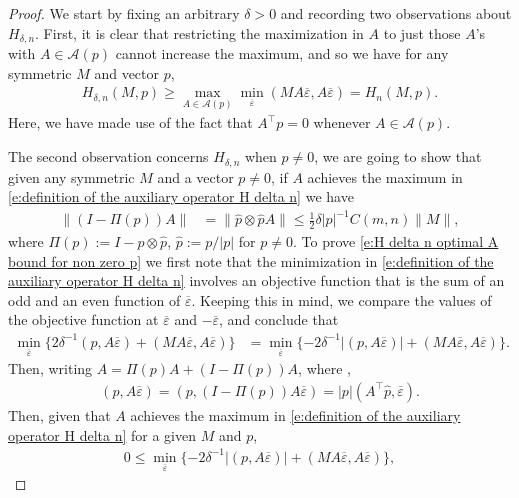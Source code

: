 \documentclass[reqno]{amsart}
\numberwithin{equation}{section}
\begin{document}
\begin{proof} We start by fixing an arbitrary $\delta>0$ and recording two observations about $H_{\delta,n}$. First, it is clear that restricting the maximization in $A$ to just those $A$'s with $A\in \mathcal{A}(p)$ cannot increase the maximum, and so we have for any symmetric $M$ and vector $p$,
\begin{align}\label{e:H delta n basic lower pointwise bound}
  H_{\delta,n}(M,p) \geq \max_{A\in\mathcal{A}(p)}\min_{\overline\varepsilon}(MA\overline\varepsilon,A\overline\varepsilon) = H_n(M,p).    
\end{align}
Here, we have made use of the fact that $A^\top p = 0$ whenever $A \in \mathcal{A}(p)$. 

The second observation concerns $H_{\delta,n}$ when $p\neq 0$, we are going to show that given any symmetric $M$ and a vector $p\neq 0$, if $A$ achieves the maximum in \eqref{e:definition of the auxiliary operator H delta n} we have 
\begin{align}\label{e:H delta n optimal A bound for non zero p}
  \|(I-\Pi(p))A\| & = 
\|\hat p \otimes \hat p A\| \leq \tfrac{1}{2}\delta |p|^{-1} C(m,n)\|M\|,  
\end{align}
where $\Pi(p) := I-\hat p\otimes \hat p$, $\hat p := p/|p|$ for $p\neq 0$. To prove \eqref{e:H delta n optimal A bound for non zero p} we first note that the minimization in \eqref{e:definition of the auxiliary operator H delta n} involves an objective function that is the sum of an odd and an even function of $\overline \varepsilon$. Keeping this in mind, we compare the values of the objective function at $\overline\varepsilon$ and $-\overline \varepsilon$, and conclude that
\begin{align}
  \min_{\overline\varepsilon}\{2\delta^{-1}(p,A\overline \varepsilon)+ (MA\overline \varepsilon,A\overline \varepsilon)\} & =   \min_{\overline\varepsilon}\{ -2\delta^{-1}|(p,A\overline \varepsilon)|+ (MA\overline \varepsilon,A\overline \varepsilon)\}. \label{e:odd_even_relationship}
\end{align}
Then, writing $A = \Pi(p)A+(I-\Pi(p))A$, where , 
\begin{align*}
  (p,A\overline \varepsilon) = (p,(I-\Pi(p))A\overline \varepsilon) =  |p|(A^\top \hat p,\overline\varepsilon). 
\end{align*}
Then, given that $A$ achieves the maximum  in \eqref{e:definition of the auxiliary operator H delta n} for a given $M$ and $p$,  
\begin{align*}
 0 \leq \min_{\overline \varepsilon}\{ -2\delta^{-1}|(p,A\overline \varepsilon)|+ (MA\overline \varepsilon,A\overline \varepsilon)\},

\end{align*}
\end{proof}
\end{document}
